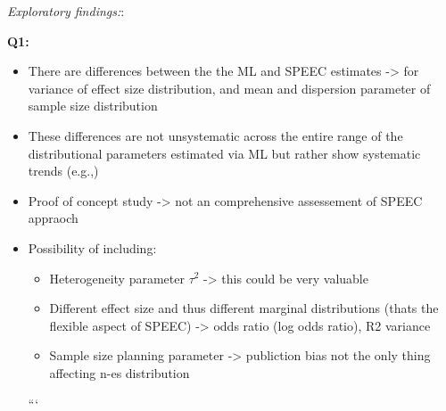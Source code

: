 \documentclass[
  12pt,
]{scrartcl}
\providecommand{\tightlist}{%
  \setlength{\itemsep}{0pt}\setlength{\parskip}{0pt}}\usepackage{longtable,booktabs,array}
\begin{document}
\emph{Exploratory findings:}:

\textbf{Q1:}

\begin{itemize}
\tightlist
\item
  There are differences between the the ML and SPEEC estimates
  -\textgreater{} for variance of effect size distribution, and mean and
  dispersion parameter of sample size distribution
\item
  These differences are not unsystematic across the entire range of the
  distributional parameters estimated via ML but rather show systematic
  trends (e.g.,)
\end{itemize}

\begin{itemize}
\tightlist
\item
  Proof of concept study -\textgreater{} not an comprehensive
  assessement of SPEEC appraoch
\end{itemize}

\begin{itemize}
\tightlist
\item
  Possibility of including:

  \begin{itemize}
  \tightlist
  \item
    Heterogeneity parameter \(\tau^2\) -\textgreater{} this could be
    very valuable
  \item
    Different effect size and thus different marginal distributions
    (thats the flexible aspect of SPEEC) -\textgreater{} odds ratio (log
    odds ratio), R2 variance
  \item
    Sample size planning parameter -\textgreater{} publiction bias not
    the only thing affecting n-es distribution
  \end{itemize}

  ```
\end{itemize}
\end{document}
